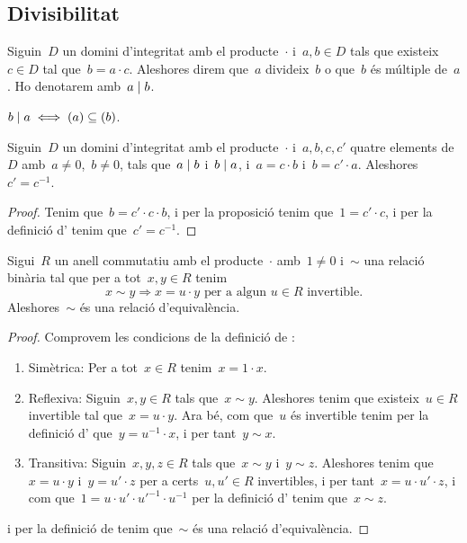 \documentclass[../../Main.tex]{subfiles}
\begin{document}
	\subsection{Divisibilitat}
	\begin{definition}
		\label{def:divisor per anells}
		\label{def:múltiple per anells}
		Siguin~\(D\) un domini d'integritat amb el producte~\(\cdot\) i~\(a,b\in D\) tals que existeix~\(c\in D\) tal que~\(b=a\cdot c\).
		Aleshores direm que~\(a\) divideix~\(b\) o que~\(b\) és múltiple de~\(a\).
		Ho denotarem amb~\(a\mathrel{|} b\).
	\end{definition}
	\begin{observation}
		\label{obs:divisors són ideals continguts}
		\(b\mathrel{|} a\iff(a)\subseteq(b)\).
	\end{observation}
	\begin{proposition}
		\label{prop:podem passar els múltiples de costat a costat}
		Siguin~\(D\) un domini d'integritat amb el producte~\(\cdot\) i~\(a,b,c,c'\) quatre elements de~\(D\) amb~\(a\neq0\),~\(b\neq0\), tals que~\(a\mathrel{|} b\) i~\(b\mathrel{|} a\), i~\(a=c\cdot b\) i~\(b=c'\cdot a\).
		Aleshores~\(c'=c^{-1}\).
		\begin{proof}
			Tenim que~\(b=c'\cdot c\cdot b\), i per la proposició  tenim que~\(1=c'\cdot c\), i per la definició d' tenim que~\(c'=c^{-1}\).
		\end{proof}
	\end{proposition}
	\begin{proposition}
		\label{prop:associats és relació d'equivalència}
		Sigui~\(R\) un anell commutatiu amb el producte~\(\cdot\) amb~\(1\neq0\) i~\(\sim\) una relació binària tal que per a tot~\(x,y\in R\) tenim
		\[
		    x\sim y\Longrightarrow x=u\cdot y\text{ per a algun }u\in R\text{ invertible}.
		\]
		Aleshores~\(\sim\) és una relació d'equivalència.
		\begin{proof}
			Comprovem les condicions de la definició de \myref{def:relació d'equivalència}:
			\begin{enumerate}
				\item Simètrica: Per a tot~\(x\in R\) tenim~\(x=1\cdot x\).
				\item Reflexiva: Siguin~\(x,y\in R\) tals que~\(x\sim y\).
				Aleshores tenim que existeix~\(u\in R\) invertible tal que~\(x=u\cdot y\).
				Ara bé, com que~\(u\) és invertible tenim per la definició d' que~\(y=u^{-1}\cdot x\), i per tant~\(y\sim x\).
				\item Transitiva: Siguin~\(x,y,z\in R\) tals que~\(x\sim y\) i~\(y\sim z\).
				Aleshores tenim que~\(x=u\cdot y\) i~\(y=u'\cdot z\) per a certs~\(u,u'\in R\) invertibles, i per tant~\(x=u\cdot u'\cdot z\), i com que~\(1=u\cdot u'\cdot {u'}^{-1}\cdot{u}^{-1}\) per la definició d' tenim que~\(x\sim z\).
			\end{enumerate}
			i per la definició de  tenim que~\(\sim\) és una relació d'equivalència.
		\end{proof}
	\end{proposition}
\end{document}
